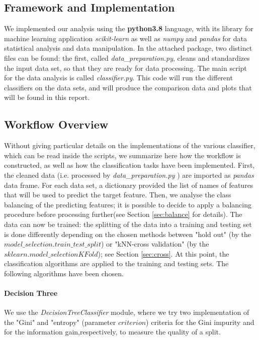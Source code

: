 \documentclass{article}
\begin{document}
\subsection{Framework and Implementation}
We implemented our analysis using the \textbf{python3.8} language, with its library for machine learning application \textit{scikit-learn} as well as \textit{numpy} and \textit{pandas} for data statistical analysis and data manipulation. In the attached package, two distinct files can be found: the first, called \textit{data\_preparation.py}, cleans and standardizes the input data set, so that they are ready for data processing. The main script for the data analysis is called \textit{classifier.py}. This code will run the different classifiers on the data sets, and will produce the comparison data and plots that will be found in this report.


\subsection{Workflow Overview}
Without giving particular details on the implementations of the various classifier, which can be read inside the scripts, we summarize here how the workflow is constructed, as well as how the classification tasks have been implemented.
First, the cleaned data (i.e. processed by \textit{data\_preparation.py} ) are imported as \textit{pandas} data frame. For each data set, a dictionary provided the list of names of features that will be used to predict the target feature. Then, we analyse the class balancing of the predicting features; it is possible to decide to apply a balancing procedure before processing further(see Section \ref{sec:balance} for details). The data can now be trained: the splitting of the data into a training and testing set is done differently depending on the chosen methods between "hold out" (by the $model\_selection.train\_test\_split$)  or "kNN-cross validation" (by the $sklearn.model\_selectionKFold$); see Section \ref{sec:cross}.
At this point, the classification algorithms are applied to the training and testing sets. The following algorithms have been chosen.

\paragraph{Decision Three} We use the \textit{DecisionTreeClassifier} module, where we try two implementation of the "Gini" and "entropy" (parameter $criterion$) criteria for the Gini impurity and for the information gain,respectively, to measure the quality of a split.
\end{document}
